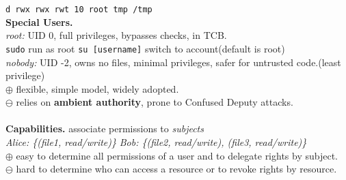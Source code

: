 \documentclass[9pt, a4paper]{extarticle}
\begin{document}
\begin{minipage}[t]{0.495\textwidth}
	\texttt{d rwx rwx rwt 10 root tmp /tmp}\\
	\textbf{Special Users.}\\
	\textit{root:} UID 0, full privileges, bypasses checks, in TCB.\\
	\texttt{sudo} run as root \quad \texttt{su [username]} switch to account(default is root)\\
	\textit{nobody:} UID -2, owns no files, minimal privileges, safer for untrusted code.(least privilege)\\
	$\oplus$ flexible, simple model, widely adopted.\\
	$\ominus$ relies on \textbf{ambient authority}, prone to Confused Deputy attacks.\\[1px]
	\\[1px]
	\noindent \textbf{Capabilities.} associate permissions to \textit{subjects}\\
	\textit{Alice: \{(file1, read/write)\}} \; \textit{Bob: \{(file2, read/write), (file3, read/write)\}}
	\\
	$\oplus$ easy to determine all permissions of a user and to delegate rights by subject.\\
	$\ominus$ hard to determine who can access a resource or to revoke rights by resource.
\end{minipage}
\footnotesize
\newpage
\end{document}
